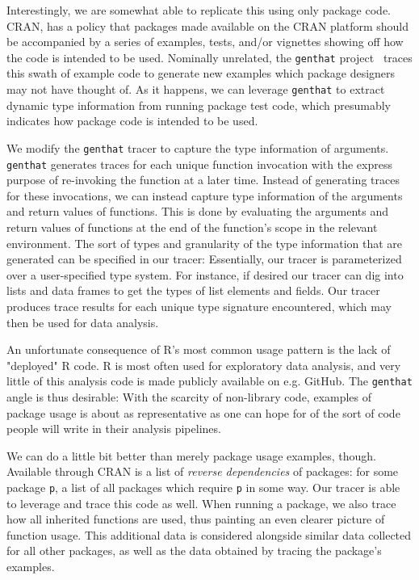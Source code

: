 \documentclass[acmsmall,10pt,review,anonymous]{acmart}\settopmatter{printfolios=true,printccs=false,printacmref=false}
\begin{document}
Interestingly, we are somewhat able to replicate this using only package
code.  CRAN, has a policy that packages made available on the CRAN platform
should be accompanied by a series of examples, tests, and/or vignettes
showing off how the code is intended to be used.  Nominally unrelated, the
{\tt genthat} project~\cite{issta18} traces this swath of example code to
generate new examples which package designers may not have thought of.  As
it happens, we can leverage {\tt genthat} to extract dynamic type
information from running package test code, which presumably indicates how
package code is intended to be used.


We modify the {\tt genthat} tracer to capture the type information of
arguments.  {\tt genthat} generates traces for each unique function
invocation with the express purpose of re-invoking the function at a later
time.  Instead of generating traces for these invocations, we can instead
capture type information of the arguments and return values of functions.
This is done by evaluating the arguments and return values of functions at
the end of the function's scope in the relevant environment.  The sort of
types and granularity of the type information that are generated can be
specified in our tracer: Essentially, our tracer is parameterized over a
user-specified type system.  For instance, if desired our tracer can dig
into lists and data frames to get the types of list elements and fields.
Our tracer produces trace results for each unique type signature
encountered, which may then be used for data analysis.

An unfortunate consequence of R's most common usage pattern is the lack of
"deployed" R code.  R is most often used for exploratory data analysis, and
very little of this analysis code is made publicly available on e.g. GitHub.
The {\tt genthat} angle is thus desirable: With the scarcity of non-library
code, examples of package usage is about as representative as one can hope
for of the sort of code people will write in their analysis pipelines.

We can do a little bit better than merely package usage examples, though.
Available through CRAN is a list of {\it reverse dependencies} of packages:
for some package {\tt p}, a list of all packages which require {\tt p} in
some way.  Our tracer is able to leverage and trace this code as well.  When
running a package, we also trace how all inherited functions are used, thus
painting an even clearer picture of function usage.  This additional data is
considered alongside similar data collected for all other packages, as well
as the data obtained by tracing the package's examples.
\end{document}
